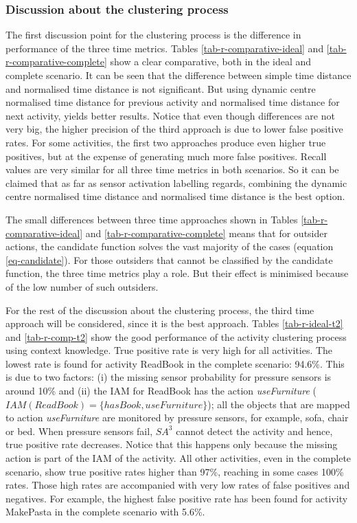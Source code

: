 \subsubsection{Discussion about the clustering process}
\label{subsubsec:evaluation:ac:discussion}

The first discussion point for the clustering process is the difference in performance of the three time metrics. Tables \ref{tab-r-comparative-ideal} and \ref{tab-r-comparative-complete} show a clear comparative, both in the ideal and complete scenario. It can be seen that the difference between simple time distance and normalised time distance is not significant. But using dynamic centre normalised time distance for previous activity and normalised time distance for next activity, yields better results. Notice that even though differences are not very big, the higher precision of the third approach is due to lower false positive rates. For some activities, the first two approaches produce even higher true positives, but at the expense of generating much more false positives. Recall values are very similar for all three time metrics in both scenarios. So it can be claimed that as far as sensor activation labelling regards, combining the dynamic centre normalised time distance and normalised time distance is the best option.

The small differences between three time approaches shown in Tables \ref{tab-r-comparative-ideal} and \ref{tab-r-comparative-complete} means that for outsider actions, the candidate function solves the vast majority of the cases (equation \ref{eq-candidate}). For those outsiders that cannot be classified by the candidate function, the three time metrics play a role. But their effect is minimised because of the low number of such outsiders.

For the rest of the discussion about the clustering process, the third time approach will be considered, since it is the best approach. Tables \ref{tab-r-ideal-t2} and \ref{tab-r-comp-t2} show the good performance of the activity clustering process using context knowledge. True positive rate is very high for all activities. The lowest rate is found for activity ReadBook in the complete scenario: 94.6\%. This is due to two factors: (i) the missing sensor probability for pressure sensors is around 10\% and (ii) the IAM for ReadBook has the action \textit{useFurniture} ($IAM(ReadBook) = \{hasBook, useFurniture\}$); all the objects that are mapped to action \textit{useFurniture} are monitored by pressure sensors, for example, sofa, chair or bed. When pressure sensors fail, $SA^3$ cannot detect the activity and hence, true positive rate decreases. Notice that this happens only because the missing action is part of the IAM of the activity. All other activities, even in the complete scenario, show true positive rates higher than 97\%, reaching in some cases 100\% rates. Those high rates are accompanied with very low rates of false positives and negatives. For example, the highest false positive rate has been found for activity MakePasta in the complete scenario with 5.6\%. 


